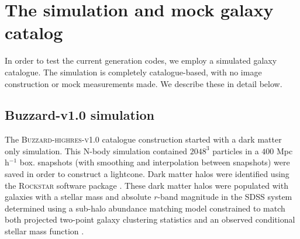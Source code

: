 \section{The simulation and mock galaxy catalog}
\label{sec:sims}

In order to test the current generation codes, we employ a simulated galaxy catalogue. The simulation is completely catalogue-based, with no image construction or mock measurements made. We describe these in detail below.

\subsection{Buzzard-v1.0 simulation}
\label{sec:buzzard}
The \textsc{Buzzard-highres-v1.0}  catalogue construction started with a dark matter only simulation. This N-body simulation contained $2048^3$ particles in a $400$ Mpc h$^{-1}$ box. \red{[N]} snapshots (with smoothing and interpolation between snapshots) were saved in order to construct a lightcone. Dark matter halos were identified using the \textsc{Rockstar} software package \citep{Behroozi:13}. These dark matter halos were populated with galaxies with a stellar mass and absolute $r$-band magnitude in the SDSS system determined using a sub-halo abundance matching model constrained to match both projected two-point galaxy clustering statistics and an observed conditional stellar mass function \citep{Reddick:13}.

